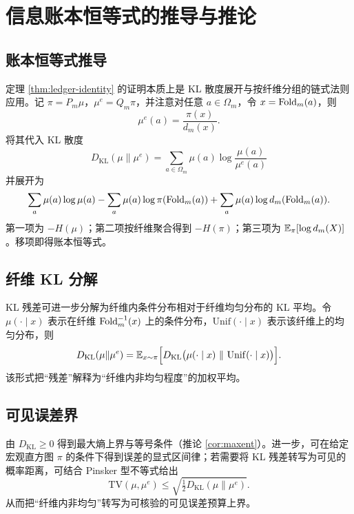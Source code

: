 \section{信息账本恒等式的推导与推论}\label{app:ledger-appendix}

\subsection{账本恒等式推导}
定理 \ref{thm:ledger-identity} 的证明本质上是 KL 散度展开与按纤维分组的链式法则应用。记 $\pi=P_m\mu$，$\mu^e=Q_m\pi$，并注意对任意 $a\in\Omega_m$，令 $x=\mathrm{Fold}_m(a)$，则
$$
\mu^e(a)=\frac{\pi(x)}{d_m(x)}.
$$
将其代入 KL 散度
$$
D_{\mathrm{KL}}(\mu\|\mu^e)=\sum_{a\in\Omega_m}\mu(a)\log\frac{\mu(a)}{\mu^e(a)}
$$
并展开为
$$
\sum_{a}\mu(a)\log\mu(a)-\sum_a\mu(a)\log\pi(\mathrm{Fold}_m(a))+\sum_a\mu(a)\log d_m(\mathrm{Fold}_m(a)).
$$
第一项为 $-H(\mu)$；第二项按纤维聚合得到 $-H(\pi)$；第三项为 $\mathbb{E}_\pi[\log d_m(X)]$。移项即得账本恒等式。

\subsection{纤维 KL 分解}
KL 残差可进一步分解为纤维内条件分布相对于纤维均匀分布的 KL 平均。令 $\mu(\cdot\mid x)$ 表示在纤维 $\mathrm{Fold}_m^{-1}(x)$ 上的条件分布，$\mathrm{Unif}(\cdot\mid x)$ 表示该纤维上的均匀分布，则
$$
D_{\mathrm{KL}}(\mu\|\mu^e)=\mathbb{E}_{x\sim\pi}\Bigl[D_{\mathrm{KL}}\bigl(\mu(\cdot\mid x)\ \|\ \mathrm{Unif}(\cdot\mid x)\bigr)\Bigr].
$$
该形式把“残差”解释为“纤维内非均匀程度”的加权平均。

\subsection{可见误差界}
由 $D_{\mathrm{KL}}\ge 0$ 得到最大熵上界与等号条件（推论 \ref{cor:maxent}）。进一步，可在给定宏观直方图 $\pi$ 的条件下得到误差的显式区间律；若需要将 KL 残差转写为可见的概率距离，可结合 Pinsker 型不等式给出
$$
\mathrm{TV}(\mu,\mu^e)\le \sqrt{\tfrac12 D_{\mathrm{KL}}(\mu\|\mu^e)}.
$$
从而把“纤维内非均匀”转写为可核验的可见误差预算上界。

